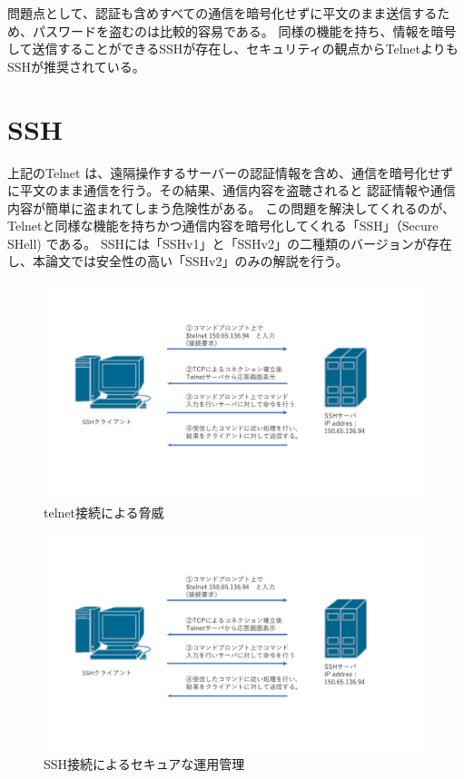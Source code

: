 \documentclass[11pt,a4j,titlepage]{jreport}
\begin{document}
問題点として、認証も含めすべての通信を暗号化せずに平文のまま送信するため、パスワードを盗むのは比較的容易である。
同様の機能を持ち、情報を暗号して送信することができるSSHが存在し、セキュリティの観点からTelnetよりもSSHが推奨されている。

\section{SSH}
上記のTelnet は、遠隔操作するサーバーの認証情報を含め、通信を暗号化せずに平文のまま通信を行う。その結果、通信内容を盗聴されると
認証情報や通信内容が簡単に盗まれてしまう危険性がある。
この問題を解決してくれるのが、Telnetと同様な機能を持ちかつ通信内容を暗号化してくれる「SSH」（Secure SHell) \cite{RFC4253}である。
SSHには「SSHv1」と「SSHv2」の二種類のバージョンが存在し、本論文では安全性の高い「SSHv2」のみの解説を行う。

\begin{figure}[tbp]
    \centering
    \includegraphics[width=1.0\textwidth, page=3]{graphs/network_archtecture.pdf}
    \caption{telnet接続による脅威}
    \label{telnet_flow}
\end{figure}
\begin{figure}[tbp]
    \centering
    \includegraphics[width=1.0\textwidth, page=4]{graphs/network_archtecture.pdf}
    \caption{SSH接続によるセキュアな運用管理}
    \label{SSH_security}
\end{figure}
\end{document}
